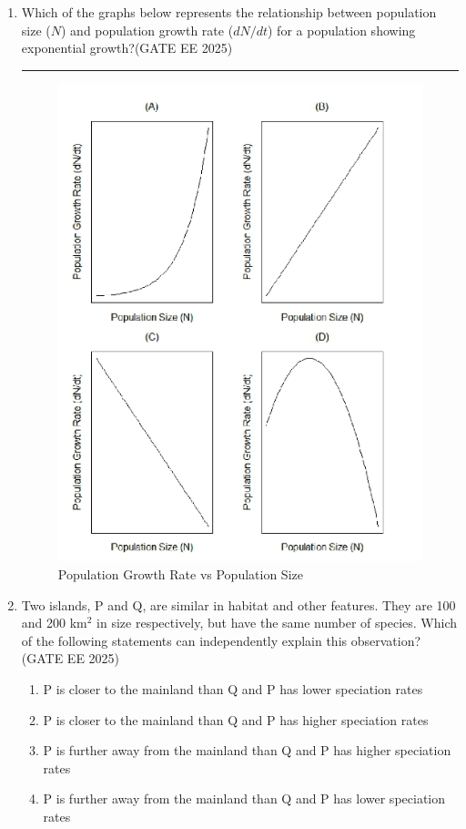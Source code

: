 \begin{enumerate}[leftmargin=*,label=\textbf{Q.\arabic*},resume]

\item Which of the graphs below represents the relationship between population size ($N$) and population growth rate ($dN/dt$) for a population showing exponential growth?\hfill {(GATE EE 2025)}

\rule{8cm}{0.15mm}

\begin{figure}[H]
    \centering
    \includegraphics[width=0.9\columnwidth]{figs/imageQ41.png}
    \caption{Population Growth Rate vs Population Size}
    \label{fig:q41-graph}
\end{figure}

\item Two islands, P and Q, are similar in habitat and other features. They are 100 and 200 km$^2$ in size respectively, but have the same number of species. Which of the following statements can independently explain this observation? \hfill {(GATE EE 2025)}
\begin{multicols}{2}
\begin{enumerate}
\item P is closer to the mainland than Q and P has lower speciation rates
\item P is closer to the mainland than Q and P has higher speciation rates
\item P is further away from the mainland than Q and P has higher speciation rates
\item P is further away from the mainland than Q and P has lower speciation rates
\end{enumerate}
\end{multicols}


\end{enumerate}
